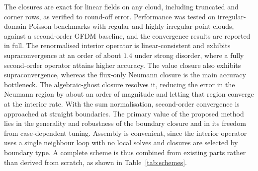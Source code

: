 \documentclass[preprint,review,12pt]{elsarticle}
\begin{document}
The closures are exact for linear fields on any cloud, including truncated and corner rows, as verified to round-off error.
Performance was tested on irregular-domain Poisson benchmarks with regular and highly irregular point clouds, against a second-order GFDM baseline, and the convergence results are reported in full.
The renormalised interior operator is linear-consistent and exhibits supraconvergence at an order of about $1.4$ under strong disorder, where a fully second-order operator attains higher accuracy.
The value closure also exhibits supraconvergence, whereas the flux-only Neumann closure is the main accuracy bottleneck.
The algebraic-ghost closure resolves it, reducing the error in the Neumann region by about an order of magnitude and letting that region converge at the interior rate.
With the sum normalisation, second-order convergence is approached at straight boundaries.
The primary value of the proposed method lies in the generality and robustness of the boundary closure and in its freedom from case-dependent tuning.
Assembly is convenient, since the interior operator uses a single neighbour loop with no local solves and closures are selected by boundary type.
A complete scheme is thus combined from existing parts rather than derived from scratch, as shown in Table~\ref{tab:schemes}.
\end{document}

